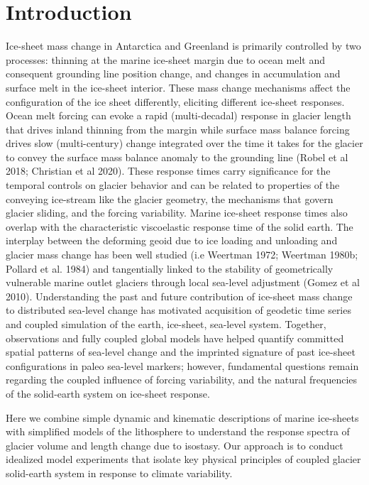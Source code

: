 \documentclass[tc, manuscript]{copernicus}
\begin{document}
\section{Introduction} 
Ice-sheet mass change in Antarctica and Greenland is primarily controlled by two processes: thinning at the marine ice-sheet margin due to ocean melt and consequent grounding line position change, and changes in accumulation and surface melt in the ice-sheet interior. 
These mass change mechanisms affect the configuration of the ice sheet differently, eliciting different ice-sheet responses. 
Ocean melt forcing can evoke a rapid (multi-decadal) response in glacier length that drives inland thinning from the margin while surface mass balance forcing drives slow (multi-century) change integrated over the time it takes for the glacier to convey the surface mass balance anomaly to the grounding line (Robel et al 2018; Christian et al 2020).
These response times carry significance for the temporal controls on glacier behavior and can be related to properties of the conveying ice-stream like the glacier geometry, the mechanisms that govern glacier sliding, and the forcing variability.
Marine ice-sheet response times also overlap with the characteristic viscoelastic response time of the solid earth.
The interplay between the deforming geoid due to ice loading and unloading and glacier mass change has been well studied (i.e Weertman 1972; Weertman 1980b; Pollard et al. 1984) and tangentially linked to the stability of geometrically vulnerable marine outlet glaciers through local sea-level adjustment (Gomez et al 2010). 
Understanding the past and future contribution of ice-sheet mass change to distributed sea-level change has motivated acquisition of geodetic time series and coupled simulation of the earth, ice-sheet, sea-level system. 
Together, observations and fully coupled global models have helped quantify committed spatial patterns of sea-level change and the imprinted signature of past ice-sheet configurations in paleo sea-level markers; however, fundamental questions remain regarding the coupled influence of forcing variability, and the natural frequencies of the solid-earth system on ice-sheet response.

Here we combine simple dynamic and kinematic descriptions of marine ice-sheets with simplified models of the lithosphere to understand the response spectra of glacier volume and length change due to isostasy. 
Our approach is to conduct idealized model experiments that isolate key physical principles of coupled glacier solid-earth system in response to climate variability. 
\end{document}
